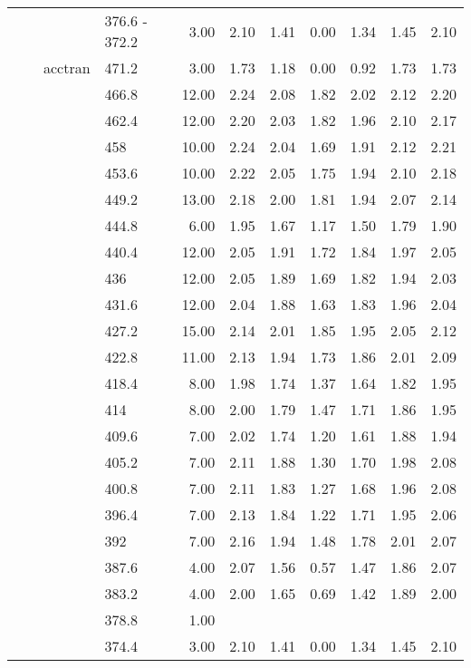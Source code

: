 \begin{longtable}{llllrrrrrrr}
   &  &  & 376.6 - 372.2 & 3.00 & 2.10 & 1.41 & 0.00 & 1.34 & 1.45 & 2.10 \\ 
   &  & acctran & 471.2 & 3.00 & 1.73 & 1.18 & 0.00 & 0.92 & 1.73 & 1.73 \\ 
   &  &  & 466.8 & 12.00 & 2.24 & 2.08 & 1.82 & 2.02 & 2.12 & 2.20 \\ 
   &  &  & 462.4 & 12.00 & 2.20 & 2.03 & 1.82 & 1.96 & 2.10 & 2.17 \\ 
   &  &  & 458 & 10.00 & 2.24 & 2.04 & 1.69 & 1.91 & 2.12 & 2.21 \\ 
   &  &  & 453.6 & 10.00 & 2.22 & 2.05 & 1.75 & 1.94 & 2.10 & 2.18 \\ 
   &  &  & 449.2 & 13.00 & 2.18 & 2.00 & 1.81 & 1.94 & 2.07 & 2.14 \\ 
   &  &  & 444.8 & 6.00 & 1.95 & 1.67 & 1.17 & 1.50 & 1.79 & 1.90 \\ 
   &  &  & 440.4 & 12.00 & 2.05 & 1.91 & 1.72 & 1.84 & 1.97 & 2.05 \\ 
   &  &  & 436 & 12.00 & 2.05 & 1.89 & 1.69 & 1.82 & 1.94 & 2.03 \\ 
   &  &  & 431.6 & 12.00 & 2.04 & 1.88 & 1.63 & 1.83 & 1.96 & 2.04 \\ 
   &  &  & 427.2 & 15.00 & 2.14 & 2.01 & 1.85 & 1.95 & 2.05 & 2.12 \\ 
   &  &  & 422.8 & 11.00 & 2.13 & 1.94 & 1.73 & 1.86 & 2.01 & 2.09 \\ 
   &  &  & 418.4 & 8.00 & 1.98 & 1.74 & 1.37 & 1.64 & 1.82 & 1.95 \\ 
   &  &  & 414 & 8.00 & 2.00 & 1.79 & 1.47 & 1.71 & 1.86 & 1.95 \\ 
   &  &  & 409.6 & 7.00 & 2.02 & 1.74 & 1.20 & 1.61 & 1.88 & 1.94 \\ 
   &  &  & 405.2 & 7.00 & 2.11 & 1.88 & 1.30 & 1.70 & 1.98 & 2.08 \\ 
   &  &  & 400.8 & 7.00 & 2.11 & 1.83 & 1.27 & 1.68 & 1.96 & 2.08 \\ 
   &  &  & 396.4 & 7.00 & 2.13 & 1.84 & 1.22 & 1.71 & 1.95 & 2.06 \\ 
   &  &  & 392 & 7.00 & 2.16 & 1.94 & 1.48 & 1.78 & 2.01 & 2.07 \\ 
   &  &  & 387.6 & 4.00 & 2.07 & 1.56 & 0.57 & 1.47 & 1.86 & 2.07 \\ 
   &  &  & 383.2 & 4.00 & 2.00 & 1.65 & 0.69 & 1.42 & 1.89 & 2.00 \\ 
   &  &  & 378.8 & 1.00 &  &  &  &  &  &  \\ 
   &  &  & 374.4 & 3.00 & 2.10 & 1.41 & 0.00 & 1.34 & 1.45 & 2.10 \\ 

\end{longtable}
